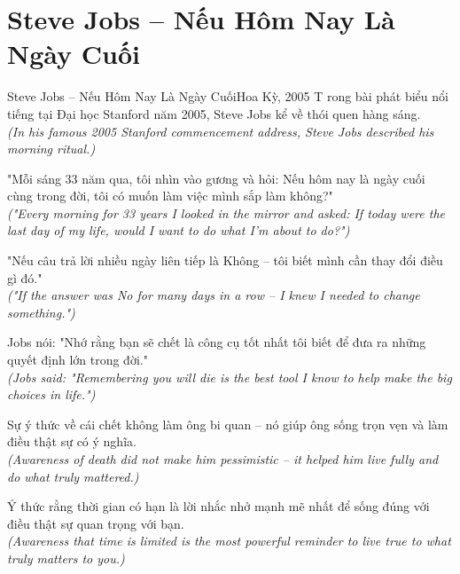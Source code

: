 \section{Steve Jobs -- Nếu Hôm Nay Là Ngày Cuối}
\begin{truyen}{Steve Jobs -- Nếu Hôm Nay Là Ngày Cuối}{Hoa Kỳ, 2005}
T rong bài phát biểu nổi tiếng tại Đại học Stanford năm 2005, Steve Jobs kể về thói quen hàng sáng.\\
\textit{(In his famous 2005 Stanford commencement address, Steve Jobs described his morning ritual.)}

"Mỗi sáng 33 năm qua, tôi nhìn vào gương và hỏi: Nếu hôm nay là ngày cuối cùng trong đời, tôi có muốn làm việc mình sắp làm không?"\\
\textit{("Every morning for 33 years I looked in the mirror and asked: If today were the last day of my life, would I want to do what I'm about to do?")}

"Nếu câu trả lời nhiều ngày liên tiếp là Không -- tôi biết mình cần thay đổi điều gì đó."\\
\textit{("If the answer was No for many days in a row -- I knew I needed to change something.")}

Jobs nói: "Nhớ rằng bạn sẽ chết là công cụ tốt nhất tôi biết để đưa ra những quyết định lớn trong đời."\\
\textit{(Jobs said: "Remembering you will die is the best tool I know to help make the big choices in life.")}

Sự ý thức về cái chết không làm ông bi quan -- nó giúp ông sống trọn vẹn và làm điều thật sự có ý nghĩa.\\
\textit{(Awareness of death did not make him pessimistic -- it helped him live fully and do what truly mattered.)}

\end{truyen}
\begin{baihoc}
  Ý thức rằng thời gian có hạn là lời nhắc nhở mạnh mẽ nhất để sống đúng với điều thật sự quan trọng với bạn.\\
  \textit{(Awareness that time is limited is the most powerful reminder to live true to what truly matters to you.)}
\end{baihoc}

